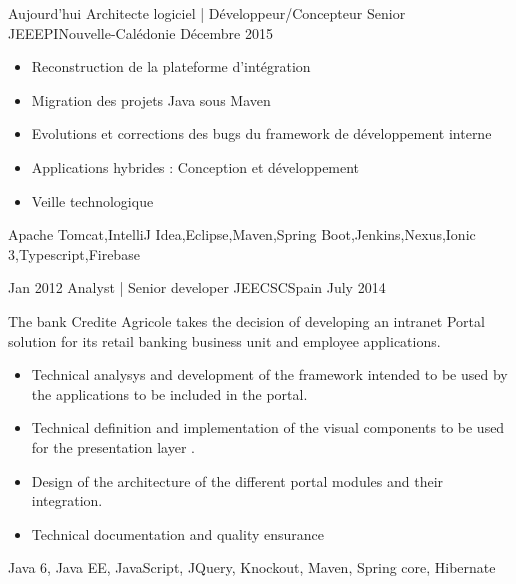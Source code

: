 %
%
%

\begin{experiences}
  \experience
    {Aujourd'hui}   {Architecte logiciel | Développeur/Concepteur Senior JEE}{EPI}{Nouvelle-Calédonie}
    {Décembre 2015} {
                      \begin{itemize}
                        \item Reconstruction de la plateforme d'intégration                        
                        \item Migration des projets Java sous Maven                    
                        \item Evolutions et corrections des bugs du framework de développement interne  
                        \item Applications hybrides : Conception et développement
                        \item Veille technologique                                                                    
                      \end{itemize}
                    }
                    {Apache Tomcat,IntelliJ Idea,Eclipse,Maven,Spring Boot,Jenkins,Nexus,Ionic 3,Typescript,Firebase}

  \emptySeparator
  
    \experience
    {Jan 2012} {Analyst | Senior developer JEE}{CSC}{Spain}
    {July 2014}    {

The bank Credite Agricole takes the decision of developing an intranet Portal solution for its
retail banking business unit and employee applications.
    	
                      \begin{itemize}
                        \item Technical analysys and development of the framework intended to be used by the applications to be included in the portal.
                        \item Technical definition and implementation of the visual components to be used for the presentation layer    .                   
                        \item Design of the architecture of the different portal modules and their integration.
                        \item Technical documentation and quality ensurance
                      \end{itemize}
                    }
                    {Java 6, Java EE, JavaScript, JQuery, Knockout, Maven, Spring core, Hibernate}
                    

\end{experiences}
